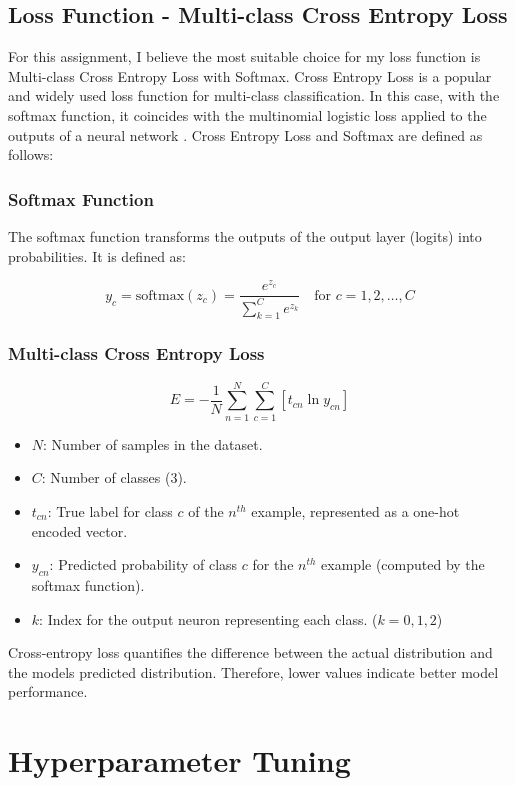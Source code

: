 \documentclass[conference]{IEEEtran}
\begin{document}
\subsection{Loss Function - Multi-class Cross Entropy Loss}
For this assignment, I believe the most suitable choice for my loss function is Multi-class Cross Entropy Loss with Softmax. Cross Entropy Loss is a popular and widely used loss function for multi-class classification. In this case, with the softmax function, it coincides with the multinomial logistic loss applied to the outputs of a neural network \cite{pmlr-v202-mao23b}. Cross Entropy Loss and Softmax are defined as follows:

\subsubsection*{Softmax Function}
The softmax function transforms the outputs of the output layer (logits) into probabilities. It is defined as:

\[
y_c = \text{softmax}(z_c) = \frac{e^{z_c}}{\sum_{k=1}^{C} e^{z_k}} \quad \text{for } c = 1, 2, \ldots, C
\]

\subsubsection*{Multi-class Cross Entropy Loss}
\[
E = -\frac{1}{N} \sum_{n=1}^{N} \sum_{c=1}^{C} \left[ t_{cn} \ln y_{cn} \right]
\]

\begin{itemize}
    \item $N$: Number of samples in the dataset.
    \item $C$: Number of classes ($3$).
    \item $t_{cn}$: True label for class $c$ of the $n^{th}$ example, represented as a one-hot encoded vector.
    \item $y_{cn}$: Predicted probability of class $c$ for the $ n^{th}$ example (computed by the softmax function).
    \item $k$: Index for the output neuron representing each class. ($k = 0,1,2$)\\
\end{itemize}
Cross-entropy loss quantifies the difference between the actual distribution and the models predicted distribution. Therefore, lower values indicate better model performance.

\section{Hyperparameter Tuning}
\end{document}
